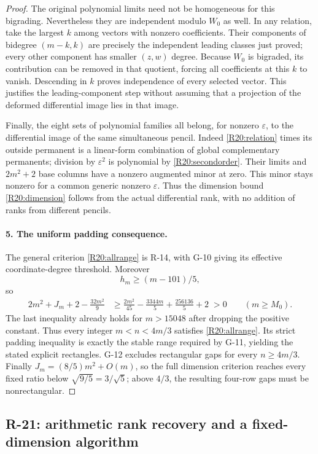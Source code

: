 \begin{proof}
The original polynomial limits need not be homogeneous for this
bigrading. Nevertheless they are independent modulo $W_0$ as well.
In any relation, take the largest $k$ among vectors with nonzero
coefficients. Their components of bidegree $(m-k,k)$ are precisely
the independent leading classes just proved; every other component
has smaller $(z,w)$ degree. Because $W_0$ is bigraded, its contribution
can be removed in that quotient, forcing all coefficients at this
$k$ to vanish. Descending in $k$ proves independence of every
selected vector. This justifies the leading-component step without
assuming that a projection of the deformed differential image lies
in that image.

Finally, the eight sets of polynomial families all belong, for
nonzero $\varepsilon$, to the differential image of the same
simultaneous pencil. Indeed \eqref{R20:relation} times its outside
permanent is a linear-form combination of global complementary
permanents; division by $\varepsilon^2$ is polynomial by
\eqref{R20:secondorder}. Their limits and $2m^2+2$ base columns
have a nonzero augmented minor at zero. This minor stays nonzero
for a common generic nonzero $\varepsilon$. Thus the dimension
bound \eqref{R20:dimension} follows from the actual differential
rank, with no addition of ranks from different pencils.

\paragraph{5. The uniform padding consequence.}
The general criterion \eqref{R20:allrange} is R-14, with G-10
giving its effective coordinate-degree threshold. Moreover
\[
 h_m\geq(m-101)/5,
\]
so
\begin{align*}
 2m^2+J_m+2-\frac{32m^2}{9}
 &\geq \frac{2m^2}{45}-\frac{3344m}{5}
                  +\frac{256136}{5}+2\;>0
 \qquad(m\geq M_0).
\end{align*}
The last inequality already holds for $m>15048$ after dropping
the positive constant. Thus every integer $m<n<4m/3$ satisfies
\eqref{R20:allrange}. Its strict padding inequality is exactly
the stable range required by G-11, yielding the stated explicit
rectangles. G-12 excludes rectangular gaps for every $n\geq4m/3$.
Finally $J_m=(8/5)m^2+O(m)$, so the full dimension criterion reaches
every fixed ratio below $\sqrt{9/5}=3/\sqrt5$; above $4/3$, the
resulting four-row gaps must be nonrectangular.
\end{proof}


\subsection{R-21: arithmetic rank recovery and a fixed-dimension algorithm}

